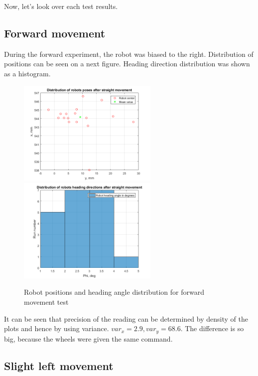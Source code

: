 \documentclass[a4paper, 12pt]{article}
\begin{document}
Now, let's look over each test results.

\newpage
\subsection{Forward movement}
During the forward experiment, the robot was biased to the right. Distribution of positions can be seen on a next figure. Heading direction distribution was shown as a histogram.

\begin{figure}[h]
  \centering
  \caption{Robot positions and heading angle distribution for forward movement test\label{fig:clouds}}
  \includegraphics[width=0.6\textwidth]{s}
  \includegraphics[width=0.6\textwidth]{sphi}
\end{figure}

It can be seen that precision of the reading can be determined by density of the plots and hence by using variance. $var_x = 2.9,var_y = 68.6$. The difference is so big, because the wheels were given the same command.
\newpage
\subsection{Slight left movement}
\end{document}
